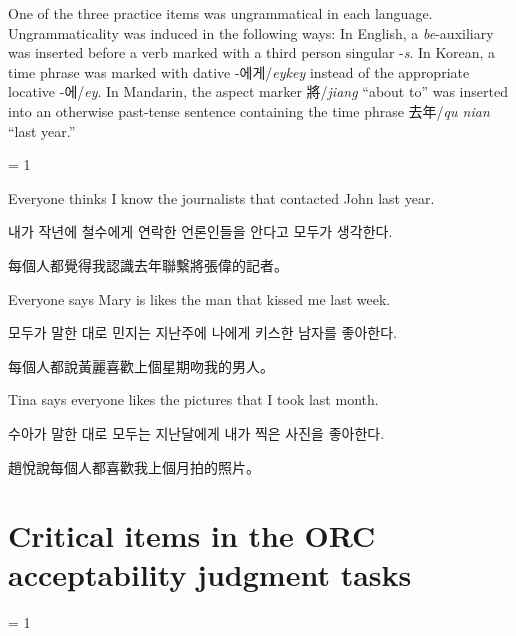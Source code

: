 \vspace{.2cm}

One of the three practice items was ungrammatical in each language. Ungrammaticality was induced in the following ways: In English, a \textit{be}-auxiliary was inserted before a verb marked with a third person singular -\textit{s}. In Korean, a time phrase was marked with dative -\ko 에게\normalfont/\textit{eykey} instead of the appropriate locative -\ko 에\normalfont/\textit{ey}. In Mandarin, the aspect marker \zh 將\normalfont/\textit{jiang} ``about to'' was inserted into an otherwise past-tense sentence containing the time phrase \zh 去年\normalfont/\textit{qu nian} ``last year.''

\vspace{.2cm}

\excnt = 1

\pex %
\a[label=E] Everyone thinks I know the journalists that contacted John last year.\par\nobreak
\a[label=K] \ko 내가 작년에 철수에게 연락한 언론인들을 안다고 모두가 생각한다.\normalfont\par\nobreak
\a[label=M] \ljudge{*} \zh 每個人都覺得我認識去年聯繫將張偉的記者。\normalfont
\xe

\pex %
\a[label=E] \ljudge{*}Everyone says Mary is likes the man that kissed me last week.\par\nobreak
\a[label=K] \ko 모두가 말한 대로 민지는 지난주에 나에게 키스한 남자를 좋아한다.\normalfont\par\nobreak
\a[label=M] \zh 每個人都說黃麗喜歡上個星期吻我的男人。\normalfont
\xe

\pex %
\a[label=E] Tina says everyone likes the pictures that I took last month.\par\nobreak
\a[label=K] \ljudge{*} \ko 수아가 말한 대로 모두는 지난달에게 내가 찍은 사진을 좋아한다.\normalfont\par\nobreak
\a[label=M] \zh 趙悅說每個人都喜歡我上個月拍的照片。\normalfont
\xe

\newpage

\section{Critical items in the ORC acceptability judgment tasks}

\excnt = 1

